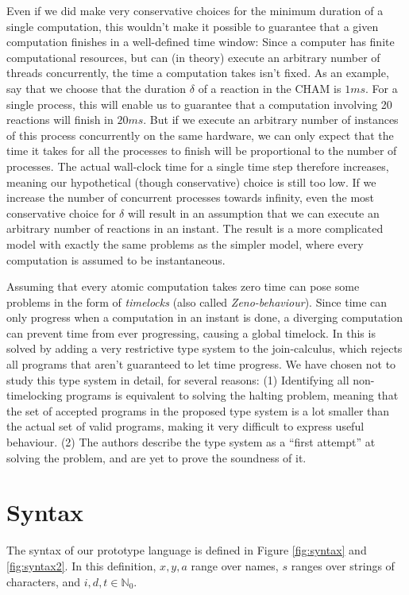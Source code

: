 Even if we did make very conservative choices for the minimum duration
of a single computation, this wouldn't make it possible to guarantee
that a given computation finishes in a well-defined time window: Since
a computer has finite computational resources, but can (in theory)
execute an arbitrary number of threads concurrently, the time a
computation takes isn't fixed. As an example, say that we choose that
the duration $\delta$ of a reaction in the CHAM is $1 ms$. For a
single process, this will enable us to guarantee that a computation
involving 20 reactions will finish in $20 ms$. But if we execute an
arbitrary number of instances of this process concurrently on the same
hardware, we can only expect that the time it takes for all the
processes to finish will be proportional to the number of processes.
The actual wall-clock time for a single time step therefore increases,
meaning our hypothetical (though conservative) choice is still too
low. If we increase the number of concurrent processes towards
infinity, even the most conservative choice for $\delta$ will result
in an assumption that we can execute an arbitrary number of reactions
in an instant. The result is a more complicated model with exactly the
same problems as the simpler model, where every computation is assumed
to be instantaneous.

Assuming that every atomic computation takes zero time can pose some
problems in the form of \emph{timelocks} (also called
\emph{Zeno-behaviour}). Since time can only progress when a
computation in an instant is done, a diverging computation can prevent
time from ever progressing, causing a global timelock.  In
\cite{timed-join} this is solved by adding a very restrictive type
system to the join-calculus, which rejects all programs that aren't
guaranteed to let time progress. We have chosen not to study this type
system in detail, for several reasons: (1) Identifying all
non-timelocking programs is equivalent to solving the halting problem,
meaning that the set of accepted programs in the proposed type system
is a lot smaller than the actual set of valid programs, making it very
difficult to express useful behaviour. (2) The authors describe the
type system as a ``first attempt'' at solving the problem, and are yet
to prove the soundness of it.


\section{Syntax}

The syntax of our prototype language is defined in Figure \ref{fig:syntax} and
\ref{fig:syntax2}. In this definition, $x,y,a$ range over names, $s$ ranges over
strings of characters, and $i,d,t \in \mathbb{N}_0$.

